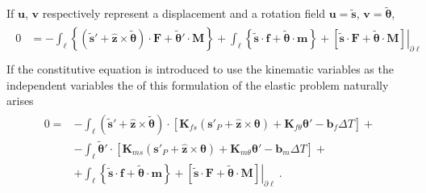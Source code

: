 \documentclass[letterpaper,10pt,english]{jupyterBook}
\begin{document}
\sphinxAtStartPar
If \(\mathbf{u}\), \(\mathbf{v}\) respectively represent a displacement and a rotation field \(\mathbf{u} = \widetilde{\mathbf{s}}\), \(\mathbf{v} = \widetilde{\boldsymbol\theta}\),
\begin{equation*}
\begin{split}\begin{aligned}
  0 
  & = - \int_{\ell} \left\{ ( \widetilde{\mathbf{s}}' + \hat{\mathbf{z}} \times \widetilde{\boldsymbol{\theta}} ) \cdot \mathbf{F} + \widetilde{\boldsymbol{\theta}}' \cdot \mathbf{M} \right\} + \int_{\ell} \left\{  \widetilde{\mathbf{s}} \cdot \mathbf{f} + \widetilde{\boldsymbol\theta} \cdot \mathbf{m} \right\} + \left. \left[ \widetilde{\mathbf{s}} \cdot \mathbf{F} + \widetilde{\boldsymbol{\theta}} \cdot \mathbf{M} \right] \right|_{\partial \ell} \\
\end{aligned}\end{split}
\end{equation*}
\sphinxAtStartPar
If the constitutive equation is introduced to use the kinematic variables as the independent variables the  of this formulation of the elastic problem naturally arises
\begin{equation*}
\begin{split}\begin{aligned}
  0 
  = & - \int_{\ell} ( \widetilde{\mathbf{s}}' + \hat{\mathbf{z}} \times \widetilde{\boldsymbol{\theta}} ) \cdot \left[ \mathbf{K}_{fs} \left( \mathbf{s}'_P + \hat{\mathbf{z}} \times \boldsymbol\theta \right) + \mathbf{K}_{f\theta} \boldsymbol\theta' - \mathbf{b}_f \Delta T \right] + \\
    & - \int_{\ell} \widetilde{\boldsymbol{\theta}}' \cdot \left[ \mathbf{K}_{ms} \left( \mathbf{s}'_P + \hat{\mathbf{z}} \times \boldsymbol\theta \right) + \mathbf{K}_{m\theta} \boldsymbol\theta' - \mathbf{b}_m \Delta T \right] + \\
    & + \int_{\ell} \left\{  \widetilde{\mathbf{s}} \cdot \mathbf{f} + \widetilde{\boldsymbol\theta} \cdot \mathbf{m} \right\} + \left. \left[ \widetilde{\mathbf{s}} \cdot \mathbf{F} + \widetilde{\boldsymbol{\theta}} \cdot \mathbf{M} \right] \right|_{\partial \ell} \ .
\end{aligned}\end{split}
\end{equation*}
\end{document}
